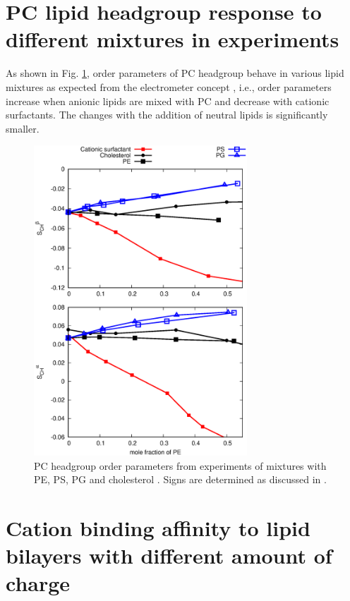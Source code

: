 \documentclass[aps,prl,superscriptaddress,twocolumn]{revtex4}
\begin{document}
\section{PC lipid headgroup response to different mixtures in experiments}
As shown in Fig. \ref{HGorderparametersPCvsPEPSPGchol}, order parameters of PC
headgroup behave in various lipid mixtures as expected from the electrometer concept \cite{seelig87, scherer87},
i.e., order parameters increase when anionic lipids are mixed with PC and decrease with cationic
surfactants. The changes with the addition of neutral lipids is significantly smaller.
\begin{figure}[]
  \centering
  \includegraphics[width=8.0cm]{../Figs/HGorderparametersPCvsPEPSPGchol.eps}
  \caption{\label{HGorderparametersPCvsPEPSPGchol}
    PC headgroup order parameters from experiments of mixtures with
    PE, PS, PG and cholesterol \cite{scherer87,scherer89,ferreira13}.
    Signs are determined as discussed in \cite{botan15,ollila16}.
  }
\end{figure}

\section{Cation binding affinity to lipid bilayers with different amount of charge}
\end{document}
